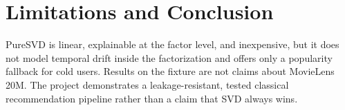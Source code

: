 \section{Limitations and Conclusion}
PureSVD is linear, explainable at the factor level, and inexpensive, but it
does not model temporal drift inside the factorization and offers only a
popularity fallback for cold users. Results on the fixture are not claims
about MovieLens 20M. The project demonstrates a leakage-resistant, tested
classical recommendation pipeline rather than a claim that SVD always wins.
